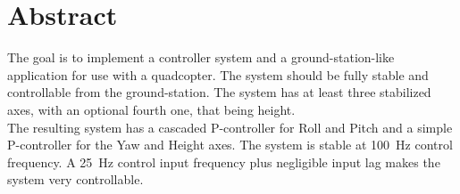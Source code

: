 \documentclass[final]{article}
\begin{document}
\section*{Abstract}
The goal is to implement a controller system and a ground-station-like application for use with a quadcopter.
The system should be fully stable and controllable from the ground-station.
The system has at least three stabilized axes, with an optional fourth one, that being height.\\
The resulting system has a cascaded P-controller for Roll and Pitch and a simple P-controller for the Yaw and Height axes.
The system is stable at \SI{100}{\hertz} control frequency.
A \SI{25}{\hertz} control input frequency plus negligible input lag makes the system very controllable.
\end{document}
